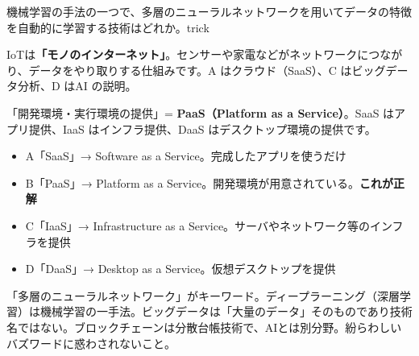 \begin{mondai}{機械学習の手法の一つで、多層のニューラルネットワークを用いてデータの特徴を自動的に学習する技術はどれか。}{trick}
\end{mondai}

\kaitoupage


\begin{kaisetsu}
IoTは\textbf{「モノのインターネット」}。センサーや家電などがネットワークにつながり、データをやり取りする仕組みです。A はクラウド（SaaS）、C はビッグデータ分析、D はAI の説明。
\end{kaisetsu}


\begin{kaisetsu}
「開発環境・実行環境の提供」= \textbf{PaaS（Platform as a Service）}。SaaS はアプリ提供、IaaS はインフラ提供、DaaS はデスクトップ環境の提供です。
\end{kaisetsu}

\begin{goutoubun}
\begin{itemize}
  \item A「SaaS」→ Software as a Service。完成したアプリを使うだけ
  \item B「PaaS」→ Platform as a Service。開発環境が用意されている。\textbf{これが正解}
  \item C「IaaS」→ Infrastructure as a Service。サーバやネットワーク等のインフラを提供
  \item D「DaaS」→ Desktop as a Service。仮想デスクトップを提供
\end{itemize}
\end{goutoubun}


\begin{trickwarn}
「多層のニューラルネットワーク」がキーワード。ディープラーニング（深層学習）は機械学習の一手法。ビッグデータは「大量のデータ」そのものであり技術名ではない。ブロックチェーンは分散台帳技術で、AIとは別分野。紛らわしいバズワードに惑わされないこと。
\end{trickwarn}




